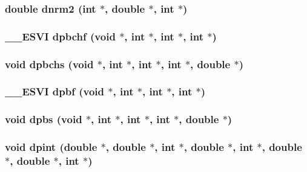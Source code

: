 \subsubsection{\setlength{\rightskip}{0pt plus 5cm}double dnrm2 (int $\ast$, double $\ast$, int $\ast$)}\label{essl_8h_baeafce8dd622da864a73c81fd311d12}


\subsubsection{\setlength{\rightskip}{0pt plus 5cm}\_\-\_\-ESVI dpbchf (void $\ast$, int $\ast$, int $\ast$, int $\ast$)}\label{essl_8h_c3788f90204b4d2c793290bcfaaff58c}


\subsubsection{\setlength{\rightskip}{0pt plus 5cm}void dpbchs (void $\ast$, int $\ast$, int $\ast$, int $\ast$, double $\ast$)}\label{essl_8h_3e2c989ec7cb9ccf48b2952fc2db120b}


\subsubsection{\setlength{\rightskip}{0pt plus 5cm}\_\-\_\-ESVI dpbf (void $\ast$, int $\ast$, int $\ast$, int $\ast$)}\label{essl_8h_ab403a9074231c7d7e543b96b215d868}


\subsubsection{\setlength{\rightskip}{0pt plus 5cm}void dpbs (void $\ast$, int $\ast$, int $\ast$, int $\ast$, double $\ast$)}\label{essl_8h_35ab22ddeae9c1932212056513dab532}


\subsubsection{\setlength{\rightskip}{0pt plus 5cm}void dpint (double $\ast$, double $\ast$, int $\ast$, double $\ast$, int $\ast$, double $\ast$, double $\ast$, int $\ast$)}\label{essl_8h_e9965d1c4781928d44fa8a24212b896e}



